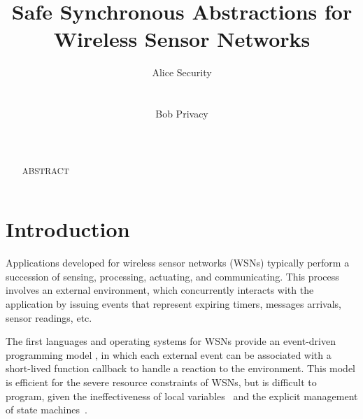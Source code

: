 \documentclass[10pt]{sensys-proc}
\author{
%
\alignauthor Alice Security \\
        \affaddr{Department of Computer Science}\\
        \affaddr{University of Southern California}\\
       \email{alice@example.edu}
\alignauthor Bob Privacy \\
    \affaddr{Networked Embedded Systems Group}\\
    \affaddr{Swedish Institute of Computer Science}\\
    \email{bob@example.se}
}
\title{Safe Synchronous Abstractions for Wireless Sensor Networks}
\begin{document}
\maketitle

\begin{abstract}
ABSTRACT
\end{abstract}




\section{Introduction}
\label{sec.intro}

\begin{comment}
TODO
Wireless sensor networks (WSNs) are composed of a large number of tiny devices 
(known as ``motes'') capable of sensing the environment and communicating among 
them.
WSNs are usually employed to continuously monitor physical phenomena in large 
or unreachable areas, such as wildfire in forests and air temperature in 
buildings.
Each mote features limited processing capabilities, a short-range radio link, 
and one or more sensors (e.g. light and temperature) \cite{wsn.survey}.
\end{comment}

Applications developed for wireless sensor networks (WSNs) typically perform a 
succession of sensing, processing, actuating, and communicating.
This process involves an external environment, which concurrently interacts 
with the application by issuing events that represent expiring timers, messages 
arrivals, sensor readings, etc.


The first languages and operating systems for WSNs provide an event-driven 
programming model \cite{wsn.tos,wsn.contiki}, in which each external event can
be associated with a short-lived function callback to handle a reaction to the 
environment.
This model is efficient for the severe resource constraints of WSNs, but is 
difficult to program, given the ineffectiveness of local 
variables~\cite{sync_async.cooperative} and the explicit management of state 
machines~\cite{wsn.protothreads}.
\end{document}
